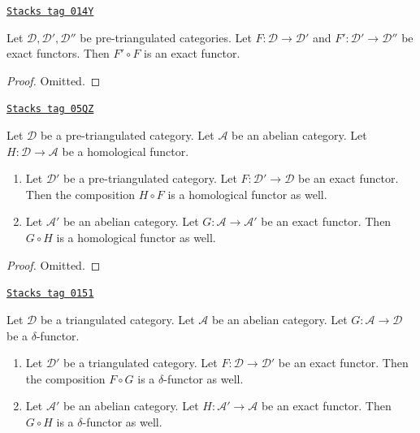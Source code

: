 \begin{lemma}
\label{derived-lemma-composition-exact}
\href{https://stacks.math.columbia.edu/tag/014Y}{\texttt{Stacks tag 014Y}}

Let $\mathcal{D}, \mathcal{D}', \mathcal{D}''$ be pre-triangulated categories.
Let $F : \mathcal{D} \to \mathcal{D}'$ and
$F' : \mathcal{D}' \to \mathcal{D}''$ be exact functors.
Then $F' \circ F$ is an exact functor.
\end{lemma}

\begin{proof}
Omitted.
\end{proof}

\begin{lemma}
\label{derived-lemma-exact-compose-homological-functor}
\href{https://stacks.math.columbia.edu/tag/05QZ}{\texttt{Stacks tag 05QZ}}

Let $\mathcal{D}$ be a pre-triangulated category.
Let $\mathcal{A}$ be an abelian category.
Let $H : \mathcal{D} \to \mathcal{A}$ be a homological functor.
\begin{enumerate}
\item Let $\mathcal{D}'$ be a pre-triangulated category.
Let $F : \mathcal{D}' \to \mathcal{D}$ be an exact functor.
Then the composition $H \circ F$ is a homological functor as well.
\item Let $\mathcal{A}'$ be an abelian category. Let
$G : \mathcal{A} \to \mathcal{A}'$ be an exact functor.
Then $G \circ H$ is a homological functor as well.
\end{enumerate}
\end{lemma}

\begin{proof}
Omitted.
\end{proof}

\begin{lemma}
\label{derived-lemma-exact-compose-delta-functor}
\href{https://stacks.math.columbia.edu/tag/0151}{\texttt{Stacks tag 0151}}

Let $\mathcal{D}$ be a triangulated category.
Let $\mathcal{A}$ be an abelian category.
Let $G : \mathcal{A} \to \mathcal{D}$ be a $\delta$-functor.
\begin{enumerate}
\item Let $\mathcal{D}'$ be a triangulated category.
Let $F : \mathcal{D} \to \mathcal{D}'$ be an exact functor.
Then the composition $F \circ G$ is a $\delta$-functor as well.
\item Let $\mathcal{A}'$ be an abelian category. Let
$H : \mathcal{A}' \to \mathcal{A}$ be an exact functor.
Then $G \circ H$ is a $\delta$-functor as well.
\end{enumerate}
\end{lemma}

